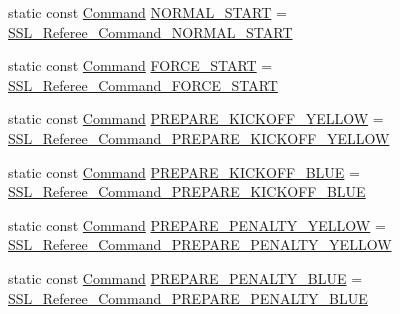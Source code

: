\begin{DoxyCompactItemize}
\item 
static const \hyperlink{referee_8pb_8h_a25bd5aba081a4c85e54d6ed275358d79}{Command} \hyperlink{class_s_s_l___referee_a9c07bc9ae2b7ca3bed466343d31f5f72}{N\-O\-R\-M\-A\-L\-\_\-\-S\-T\-A\-R\-T} = \hyperlink{referee_8pb_8h_a25bd5aba081a4c85e54d6ed275358d79a1ac2f082c8147d6452ca546f5d6f53bd}{S\-S\-L\-\_\-\-Referee\-\_\-\-Command\-\_\-\-N\-O\-R\-M\-A\-L\-\_\-\-S\-T\-A\-R\-T}
\item 
static const \hyperlink{referee_8pb_8h_a25bd5aba081a4c85e54d6ed275358d79}{Command} \hyperlink{class_s_s_l___referee_ad580daebcffe63cebdd98a21910fd375}{F\-O\-R\-C\-E\-\_\-\-S\-T\-A\-R\-T} = \hyperlink{referee_8pb_8h_a25bd5aba081a4c85e54d6ed275358d79adec8aa6a7131958d600903c503c0a3ff}{S\-S\-L\-\_\-\-Referee\-\_\-\-Command\-\_\-\-F\-O\-R\-C\-E\-\_\-\-S\-T\-A\-R\-T}
\item 
static const \hyperlink{referee_8pb_8h_a25bd5aba081a4c85e54d6ed275358d79}{Command} \hyperlink{class_s_s_l___referee_ab828a645f6f1aaad9234054150419e83}{P\-R\-E\-P\-A\-R\-E\-\_\-\-K\-I\-C\-K\-O\-F\-F\-\_\-\-Y\-E\-L\-L\-O\-W} = \hyperlink{referee_8pb_8h_a25bd5aba081a4c85e54d6ed275358d79ac771e251603e70a286efb0d8cf6b7744}{S\-S\-L\-\_\-\-Referee\-\_\-\-Command\-\_\-\-P\-R\-E\-P\-A\-R\-E\-\_\-\-K\-I\-C\-K\-O\-F\-F\-\_\-\-Y\-E\-L\-L\-O\-W}
\item 
static const \hyperlink{referee_8pb_8h_a25bd5aba081a4c85e54d6ed275358d79}{Command} \hyperlink{class_s_s_l___referee_a1faf30d180c1b0baf5d2df13564c7f86}{P\-R\-E\-P\-A\-R\-E\-\_\-\-K\-I\-C\-K\-O\-F\-F\-\_\-\-B\-L\-U\-E} = \hyperlink{referee_8pb_8h_a25bd5aba081a4c85e54d6ed275358d79a2c57a425d563d6a465183117f6ffef67}{S\-S\-L\-\_\-\-Referee\-\_\-\-Command\-\_\-\-P\-R\-E\-P\-A\-R\-E\-\_\-\-K\-I\-C\-K\-O\-F\-F\-\_\-\-B\-L\-U\-E}
\item 
static const \hyperlink{referee_8pb_8h_a25bd5aba081a4c85e54d6ed275358d79}{Command} \hyperlink{class_s_s_l___referee_a5b7689c7d9a80905d5b443a3b50b18d8}{P\-R\-E\-P\-A\-R\-E\-\_\-\-P\-E\-N\-A\-L\-T\-Y\-\_\-\-Y\-E\-L\-L\-O\-W} = \hyperlink{referee_8pb_8h_a25bd5aba081a4c85e54d6ed275358d79af42dc6dc0a6b00e1f0fa029a0cb06a52}{S\-S\-L\-\_\-\-Referee\-\_\-\-Command\-\_\-\-P\-R\-E\-P\-A\-R\-E\-\_\-\-P\-E\-N\-A\-L\-T\-Y\-\_\-\-Y\-E\-L\-L\-O\-W}
\item 
static const \hyperlink{referee_8pb_8h_a25bd5aba081a4c85e54d6ed275358d79}{Command} \hyperlink{class_s_s_l___referee_a19b9baf1a1fdb80482599fcb38c4a047}{P\-R\-E\-P\-A\-R\-E\-\_\-\-P\-E\-N\-A\-L\-T\-Y\-\_\-\-B\-L\-U\-E} = \hyperlink{referee_8pb_8h_a25bd5aba081a4c85e54d6ed275358d79ab59ecc7245b680b286a4bc5b56823b27}{S\-S\-L\-\_\-\-Referee\-\_\-\-Command\-\_\-\-P\-R\-E\-P\-A\-R\-E\-\_\-\-P\-E\-N\-A\-L\-T\-Y\-\_\-\-B\-L\-U\-E}

\end{DoxyCompactItemize}
